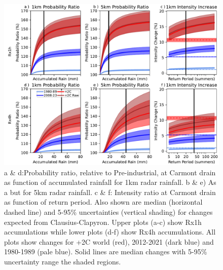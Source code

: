 \documentclass[11pt,a4paper]{article}
\begin{document}
    


\begin{figure}
	\centering
	\includegraphics[width=1\linewidth]{intens_prob_ratios}
	\caption{a \& d:Probability ratio, relative to Pre-industrial, at Carmont drain as function of accumulated rainfall for 1km radar rainfall. b \& e) As a but for 5km radar rainfall. c \& f: Intensity ratio at Carmont drain  as function of  return period. Also shown are median (horizontal dashed line) and 5-95\% uncertainties (vertical shading) for changes expected from Clausius-Clapyron. Upper plots (a-c) show Rx1h accumulations while lower plots (d-f) show Rx4h accumulations. All plots show changes for +2C world (red), 2012-2021 (dark blue) and 1980-1989 (pale blue). Solid lines are median changes with 5-95\% uncertainty range the shaded regions.}
	\label{fig:int_pr}
\end{figure}
\end{document}
